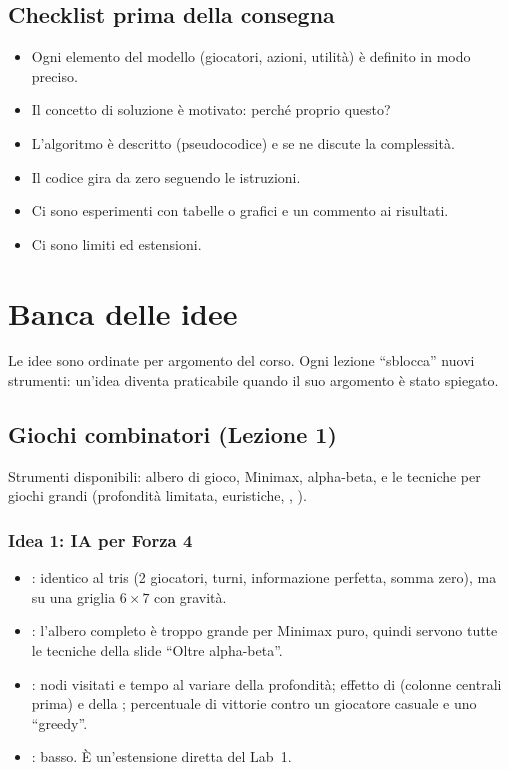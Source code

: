\documentclass[11pt, a4paper, oneside, openany]{book}
\newcommand{\stato}[2]{\etichetta{#1}{#2}}
\newcommand{\sbloccata}[1]{\stato{blu}{DA LEZIONE #1}}
\begin{document}
\section{Checklist prima della consegna}

\begin{itemize}
  \item[$\square$] Ogni elemento del modello (giocatori, azioni, utilità) è definito in modo preciso.
  \item[$\square$] Il concetto di soluzione è motivato: perché proprio questo?
  \item[$\square$] L'algoritmo è descritto (pseudocodice) e se ne discute la complessità.
  \item[$\square$] Il codice gira da zero seguendo le istruzioni.
  \item[$\square$] Ci sono esperimenti con tabelle o grafici e un commento ai risultati.
  \item[$\square$] Ci sono limiti ed estensioni.
\end{itemize}

\chapter{Banca delle idee}
\label{cap:idee}

Le idee sono ordinate per argomento del corso. Ogni lezione ``sblocca'' nuovi strumenti:
un'idea diventa praticabile quando il suo argomento è stato spiegato.

\section{Giochi combinatori (Lezione 1)}

Strumenti disponibili: albero di gioco, Minimax, alpha-beta, e le tecniche per giochi grandi
(profondità limitata, euristiche, , ).

\subsection*{Idea 1: IA per Forza 4 \hfill\sbloccata{1}}
\begin{itemize}
  \item {}: identico al tris (2 giocatori, turni, informazione perfetta, somma zero),
        ma su una griglia $6\times7$ con gravità.
  \item {}: l'albero completo è troppo grande per Minimax puro, quindi
        servono tutte le tecniche della slide ``Oltre alpha-beta''.
  \item {}: nodi visitati e tempo al variare della profondità; effetto di
         (colonne centrali prima) e della ;
        percentuale di vittorie contro un giocatore casuale e uno ``greedy''.
  \item {}: basso. È un'estensione diretta del Lab~1.
\end{itemize}
\end{document}
